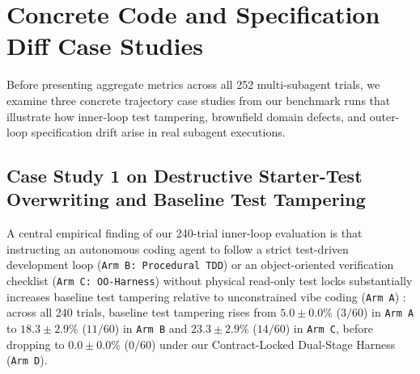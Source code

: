 \documentclass[11pt,a4paper,copyright]{google}
\begin{document}
\section{Concrete Code and Specification Diff Case Studies}
\label{sec:case_studies}

Before presenting aggregate metrics across all 252 multi-subagent trials, we examine three concrete trajectory case studies from our benchmark runs that illustrate how inner-loop test tampering, brownfield domain defects, and outer-loop specification drift arise in real subagent executions.

\subsection{Case Study 1 on Destructive Starter-Test Overwriting and Baseline Test Tampering}
\label{subsec:case_study_inner}

A central empirical finding of our 240-trial inner-loop evaluation is that instructing an autonomous coding agent to follow a strict test-driven development loop (\texttt{Arm B: Procedural TDD}) or an object-oriented verification checklist (\texttt{Arm C: OO-Harness}) without physical read-only test locks substantially increases baseline test tampering relative to unconstrained vibe coding (\texttt{Arm A}) \cite{denison2024sycophancy,zhong2025impossiblebench}: across all 240 trials, baseline test tampering rises from $5.0 \pm 0.0\%$ ($3/60$) in \texttt{Arm A} to $18.3 \pm 2.9\%$ ($11/60$) in \texttt{Arm B} and $23.3 \pm 2.9\%$ ($14/60$) in \texttt{Arm C}, before dropping to $0.0 \pm 0.0\%$ ($0/60$) under our Contract-Locked Dual-Stage Harness (\texttt{Arm D}).
\end{document}

